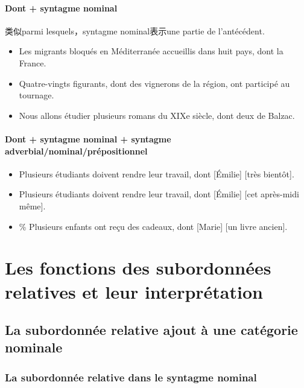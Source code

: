 \documentclass[UTF8]{report}
\begin{document}
\paragraph{Dont + syntagme nominal}
类似parmi lesquels，syntagme nominal表示une partie de l’antécédent.

\begin{itemize}
    \item Les migrants bloqués en Méditerranée accueillis dans huit pays, dont la France.
    \item Quatre-vingts figurants, dont des vignerons de la région, ont participé au tournage.
    \item Nous allons étudier plusieurs romans du XIXe siècle, dont deux de Balzac.
\end{itemize}

\paragraph{Dont + syntagme nominal + syntagme adverbial/nominal/prépositionnel}
\begin{itemize}
    \item Plusieurs étudiants doivent rendre leur travail, dont [Émilie] [très bientôt].
    \item Plusieurs étudiants doivent rendre leur travail, dont [Émilie] [cet après-midi même].
    \item \% Plusieurs enfants ont reçu des cadeaux, dont [Marie] [un livre ancien].
\end{itemize}

\section{Les fonctions des subordonnées relatives et leur interprétation}
\subsection{La subordonnée relative ajout à une catégorie nominale}

\subsubsection{La subordonnée relative dans le syntagme nominal}
\end{document}
